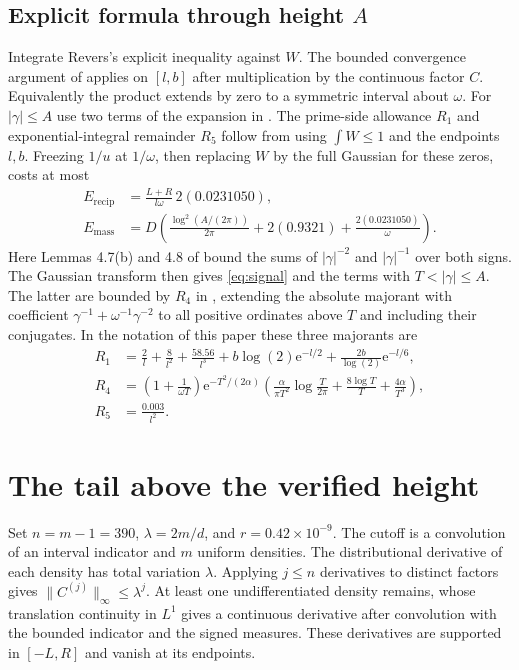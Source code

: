 \documentclass[11pt]{article}
\newcommand{\ee}{\mathrm{e}}
\begin{document}
\subsection{Explicit formula through height \(A\)}
Integrate Revers's explicit inequality \cite[(4.10)]{revers} against
$W$. The bounded convergence argument of \cite[(5.1)]{revers}
applies on $[l,b]$ after multiplication by the continuous factor $C$.
Equivalently the product extends by zero to a symmetric interval
about $\omega$.
For $|\gamma|\le A$ use two terms of the expansion in
\cite[(4.12)]{revers}. The prime-side allowance $R_1$ and
exponential-integral remainder $R_5$ follow from
\cite[(5.2), (5.6)]{revers} using $\int W\le1$ and the endpoints $l,b$.
Freezing $1/u$ at $1/\omega$, then replacing $W$ by the full Gaussian
for these zeros, costs at most
\begin{align*}
E_{\mathrm{recip}}&=\frac{L+R}{l\omega}\,2(0.0231050),\\
E_{\mathrm{mass}}&=D\left(
\frac{\log^2(A/(2\pi))}{2\pi}+2(0.9321)+\frac{2(0.0231050)}{\omega}\right).
\end{align*}
Here Lemmas 4.7(b) and 4.8 of \cite{revers} bound the sums of
$|\gamma|^{-2}$ and $|\gamma|^{-1}$ over both signs. The Gaussian
transform then gives \eqref{eq:signal} and the terms with
$T<|\gamma|\le A$. The latter are bounded by $R_4$ in
\cite[(5.5)]{revers}, extending the absolute majorant with
coefficient $\gamma^{-1}+\omega^{-1}\gamma^{-2}$ to all
positive ordinates above $T$ and including their conjugates.
In the notation of this paper these three majorants are
\begin{align*}
R_1&=\frac{2}{l}+\frac{8}{l^2}+\frac{58.56}{l^3}
      +b\log(2)\ee^{-l/2}+\frac{2b}{\log(2)}\ee^{-l/6},\\
R_4&=\left(1+\frac1{\omega T}\right)\ee^{-T^2/(2\alpha)}
      \left(\frac{\alpha}{\pi T^2}\log\frac{T}{2\pi}
      +\frac{8\log T}{T}+\frac{4\alpha}{T^3}\right),\\
R_5&=\frac{0.003}{l^2}.
\end{align*}

\section{The tail above the verified height}
Set $n=m-1=390$, $\lambda=2m/d$, and $r=0.42\times10^{-9}$.
The cutoff is a convolution of an interval indicator and $m$
uniform densities. The distributional derivative of each density
has total variation $\lambda$. Applying $j\le n$ derivatives to
distinct factors gives $\|C^{(j)}\|_\infty\le\lambda^j$.
At least one undifferentiated density remains, whose translation
continuity in $L^1$ gives a continuous derivative after convolution
with the bounded indicator and the signed measures.
These derivatives are supported in $[-L,R]$ and vanish at its endpoints.
\end{document}
